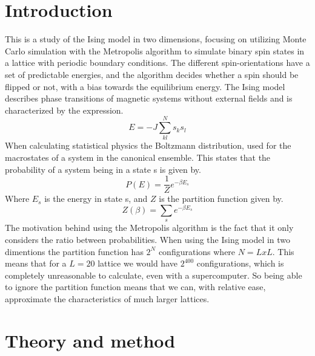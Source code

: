 \documentclass{emulateapj}
\begin{document}
\section{Introduction}
\label{sec:introduction}
This is a study of the Ising model in two dimensions, focusing on utilizing Monte Carlo simulation with the Metropolis algorithm to simulate binary spin states in a lattice with periodic boundary conditions. The different spin-orientations have a set of predictable energies, and the algorithm decides whether a spin should be flipped or not, with a bias towards the equilibrium energy. The Ising model describes phase transitions of magnetic systems without external fields and is characterized by the expression.
%
\begin{equation*}
    E = -J \sum_{kl}^{N} s_{k}s_{l}
\end{equation*}
%
When calculating statistical physics the Boltzmann distribution, used for the macrostates of a system in the canonical ensemble. This states that the probability of a system being in a state s is given by.
\begin{equation*}
    P(E) = \frac{1}{Z} e^{-\beta E_s}
\end{equation*}
%
Where $E_s$ is the energy in state s, and $Z$ is the partition function given by.
%
\begin{equation*}
    Z(\beta) = \sum_s e^{-\beta E_s}
\end{equation*}
%
The motivation behind using the Metropolis algorithm is the fact that it only considers the ratio between probabilities. When using the Ising model in two dimentions the partition function has $2^N$ configurations where $N = LxL$. This means that for a $L = 20$ lattice we would have $2^400$ configurations, which is completely unreasonable to calculate, even with a supercomputer. So being able to ignore the partition function means that we can, with relative ease, approximate the characteristics of much larger lattices.


\section{Theory and method}
\label{sec:method}
\end{document}
